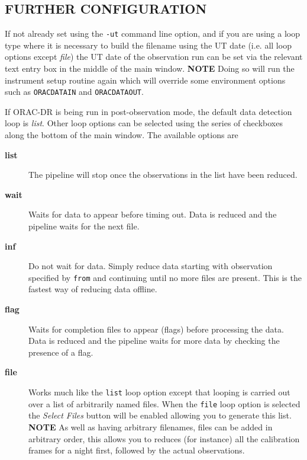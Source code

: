 \documentclass[twoside,11pt]{article}
\renewcommand{\_}{\texttt{\symbol{95}}}
\begin{document}
\subsection*{FURTHER CONFIGURATION\label{Xoracdr_FURTHER_CONFIGURATION}}


If not already set using the \texttt{-ut} command line option, and if you
are using a loop type where it is necessary to build the filename
using the UT date (i.e. all loop options except \textit{file}) the UT date
of the observation run can be set via the relevant text entry box in
the middle of the main window. \textbf{NOTE} Doing so will run the
instrument setup routine again which will override some environment
options such as \texttt{ORAC\_DATA\_IN} and \texttt{ORAC\_DATA\_OUT}.



If ORAC-DR is being run in post-observation mode, the default data
detection loop is \textit{list}. Other loop options can be selected using
the series of checkboxes along the bottom of the main window. The
available options are

\begin{description}

\item[\textbf{list}] \mbox{}

The pipeline will stop once the observations in the list have been
reduced.


\item[\textbf{wait}] \mbox{}

Waits for data to appear before timing out. Data is reduced and the
pipeline waits for the next file.


\item[\textbf{inf}] \mbox{}

Do not wait for data. Simply reduce data starting with observation
specified by \texttt{from} and continuing until no more files are present.
This is the fastest way of reducing data offline.


\item[\textbf{flag}] \mbox{}

Waits for completion files to appear (flags) before processing the
data.  Data is reduced and the pipeline waits for more data by
checking the presence of a flag.


\item[\textbf{file}] \mbox{}

Works much like the \texttt{list} loop option except that looping is carried
out over a list of arbitrarily named files. When the \texttt{file} loop option
is selected the \textit{Select Files} button will be enabled allowing you to
generate this list. \textbf{NOTE} As well as having arbitrary filenames,
files can be added in arbitrary order, this allows you to reduces (for
instance) all the calibration frames for a night first, followed by
the actual observations.

\end{description}
\end{document}
